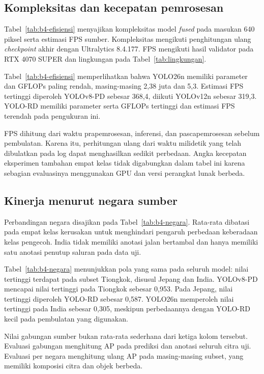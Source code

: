 \subsection{Kompleksitas dan kecepatan pemrosesan}
Tabel~\ref{tab:b4-efisiensi} menyajikan kompleksitas model \textit{fused} pada masukan 640 piksel serta estimasi FPS sumber. Kompleksitas mengikuti penghitungan ulang \textit{checkpoint} akhir dengan Ultralytics 8.4.177. FPS mengikuti hasil validator pada RTX 4070 SUPER dan lingkungan pada Tabel~\ref{tab:lingkungan}.

Tabel~\ref{tab:b4-efisiensi} memperlihatkan bahwa YOLO26n memiliki parameter dan GFLOPs paling rendah, masing-masing 2,38 juta dan 5,3. Estimasi FPS tertinggi diperoleh YOLOv8-PD sebesar 368,4, diikuti YOLOv12n sebesar 319,3. YOLO-RD memiliki parameter serta GFLOPs tertinggi dan estimasi FPS terendah pada pengukuran ini.

FPS dihitung dari waktu prapemrosesan, inferensi, dan pascapemrosesan sebelum pembulatan. Karena itu, perhitungan ulang dari waktu milidetik yang telah dibulatkan pada log dapat menghasilkan sedikit perbedaan. Angka kecepatan eksperimen tambahan empat kelas tidak digabungkan dalam tabel ini karena sebagian evaluasinya menggunakan GPU dan versi perangkat lunak berbeda.

\subsection{Kinerja menurut negara sumber}
Perbandingan negara disajikan pada Tabel~\ref{tab:b4-negara}. Rata-rata dibatasi pada empat kelas kerusakan untuk menghindari pengaruh perbedaan keberadaan kelas pengecoh. India tidak memiliki anotasi jalan bertambal dan hanya memiliki satu anotasi penutup saluran pada data uji.

Tabel~\ref{tab:b4-negara} menunjukkan pola yang sama pada seluruh model: nilai tertinggi terdapat pada subset Tiongkok, disusul Jepang dan India. YOLOv8-PD mencapai nilai tertinggi pada Tiongkok sebesar 0,953. Pada Jepang, nilai tertinggi diperoleh YOLO-RD sebesar 0,587. YOLO26n memperoleh nilai tertinggi pada India sebesar 0,305, meskipun perbedaannya dengan YOLO-RD kecil pada pembulatan yang digunakan.

Nilai gabungan sumber bukan rata-rata sederhana dari ketiga kolom tersebut. Evaluasi gabungan menghitung AP pada prediksi dan anotasi seluruh citra uji. Evaluasi per negara menghitung ulang AP pada masing-masing subset, yang memiliki komposisi citra dan objek berbeda.

